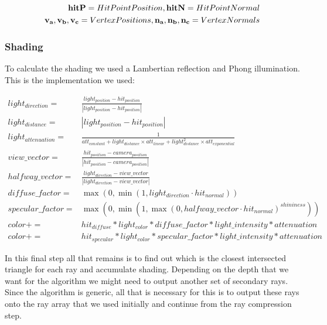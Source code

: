 \begin{align*}
    \textbf{hitP} = Hit Point Position,     
    \textbf{hitN} = Hit Point Normal\\
    \textbf{v\textsubscript{a}}, \textbf{v\textsubscript{b}}, \textbf{v\textsubscript{c}} = Vertex Positions,                     
    \textbf{n\textsubscript{a}}, \textbf{n\textsubscript{b}}, \textbf{n\textsubscript{c}} = Vertex Normals\\
\end{align*}

\subsubsection{Shading}

To calculate the shading we used a Lambertian reflection and Phong illumination. This is the implementation we used:

\begin{subequations}
    \begin{flalign}
        {light_{direction}} = & 
        {\frac{light_{position} - hit_{position}}{|light_{position} - hit_{position}|}}\\[10pt]
        {light_{distance} =} & 
        {|light_{position} - hit_{position}|}\\[10pt]          
        {light_{attenuation} =} & 
        {\frac{1}{att_{constant} + light_{distance} \times att_{linear} + light_{distance}^2 \times att_{exponential}}}\\[10pt]
        {view\_vector} = & 
        {\frac{hit_{position} - camera_{position}}{|hit_{position} - camera_{position}|}}\\[10pt]
        {halfway\_vector} = & 
        {\frac{light_{direction} - view\_vector}{|light_{direction} - view\_vector|}}\\[10pt]
        {diffuse\_factor} = & {\max(0,\min(1, light_{direction} \cdot hit_{normal}))}\\[10pt]
        {specular\_factor} = & {\max(0,\min(1,\max(0,halfway\_vector \cdot hit_{normal})^{shininess}))}\\[10pt]
        {color} += & {hit_{diffuse} * light_{color} * diffuse\_factor * light\_intensity * attenuation}\\[10pt]
        {color} += & {hit_{specular} * light_{color} * specular\_factor * light\_intensity * attenuation}
    \end{flalign}
\end{subequations}

In this final step all that remains is to find out which is the closest intersected triangle for each ray and accumulate shading. Depending on the depth that we want for the algorithm we might need to output another set of secondary rays. Since the algorithm is generic, all that is necessary for this is to output these rays onto the ray array that we used initially and continue from the ray compression step.